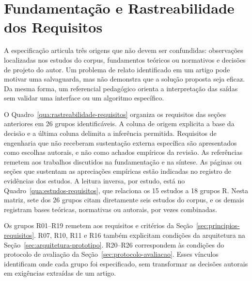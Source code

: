\section{Fundamentação e Rastreabilidade dos Requisitos}
\label{sec:rastreabilidade-requisitos}

A especificação articula três origens que não devem ser confundidas: observações localizadas nos estudos do corpus, fundamentos teóricos ou normativos e decisões de projeto do autor. Um problema de relato identificado em um artigo pode motivar uma salvaguarda, mas não demonstra que a solução proposta seja eficaz. Da mesma forma, um referencial pedagógico orienta a interpretação das saídas sem validar uma interface ou um algoritmo específico.

O Quadro~\ref{qua:rastreabilidade-requisitos} organiza os requisitos das seções anteriores em 26 grupos identificáveis. A coluna de origem explicita a base da decisão e a última coluna delimita a inferência permitida. Requisitos de engenharia que não receberam sustentação externa específica são apresentados como escolhas autorais, e não como achados empíricos da revisão. As referências remetem aos trabalhos discutidos na fundamentação e na síntese. As páginas ou seções que sustentam as apreciações empíricas estão indicadas no registro de evidências dos estudos. A leitura inversa, por estudo, está no Quadro~\ref{qua:estudos-requisitos}, que relaciona os 15 estudos a 18 grupos R. Nesta matriz, sete dos 26 grupos citam diretamente seis estudos do corpus, e os demais registram bases teóricas, normativas ou autorais, por vezes combinadas.

Os grupos R01--R19 remetem aos requisitos e critérios da Seção~\ref{sec:principios-requisitos}. R07, R10, R11 e R16 também explicitam condições da arquitetura na Seção~\ref{sec:arquitetura-prototipo}. R20--R26 correspondem às condições do protocolo de avaliação da Seção~\ref{sec:protocolo-avaliacao}. Esses vínculos identificam onde cada grupo foi especificado, sem transformar as decisões autorais em exigências extraídas de um artigo.

\begingroup
{}
\def\LTcaptype{quadro}

